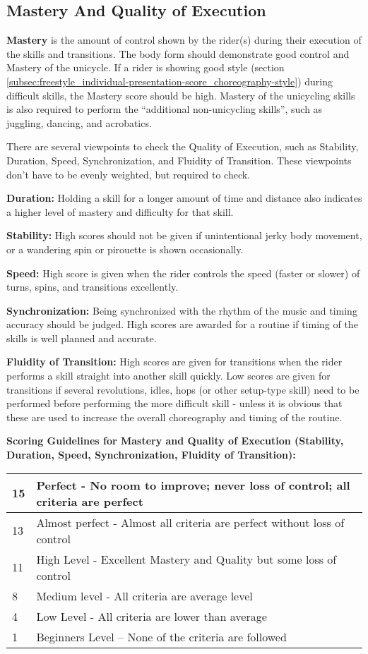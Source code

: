 \subsection{Mastery And Quality of Execution}
\textbf{Mastery} is the amount of control shown by the rider(s) during their execution of the skills and transitions.
The body form should demonstrate good control and Mastery of the unicycle.
If a rider is showing good style (section \ref{subsec:freestyle_individual-presentation-score_choreography-style}) during difficult skills, the Mastery score should be high.
Mastery of the unicycling skills is also required to perform the ``additional non-unicycling skills'', such as juggling, dancing, and acrobatics.

There are several viewpoints to check the Quality of Execution, such as Stability, Duration, Speed, Synchronization, and Fluidity of Transition.
These viewpoints don't have to be evenly weighted, but required to check.

\textbf{Duration:} Holding a skill for a longer amount of time and distance also indicates a higher level of mastery and difficulty for that skill.

\textbf{Stability:} High scores should not be given if unintentional jerky body movement, or a wandering spin or pirouette is shown occasionally.

\textbf{Speed:} High score is given when the rider controls the speed (faster or slower) of turns, spins, and transitions excellently.

\textbf{Synchronization:} Being synchronized with the rhythm of the music and timing accuracy should be judged.
High scores are awarded for a routine if timing of the skills is well planned and accurate.

\textbf{Fluidity of Transition:} High scores are given for transitions when the rider performs a skill straight into another skill quickly.
Low scores are given for transitions if several revolutions, idles, hops (or other setup-type skill) need to be performed before performing the more difficult skill - unless it is obvious that these are used to increase the overall choreography and timing of the routine.

\textbf{Scoring Guidelines for Mastery and Quality of Execution (Stability, Duration, Speed, Synchronization, Fluidity of Transition):} 

\begin{tabular}{|l|p{12.5cm}|}
\hline
15 & Perfect - No room to improve; never loss of control; all criteria are perfect \\
\hline
13 & Almost perfect - Almost all criteria are perfect without loss of control \\
\hline
11 & High Level - Excellent Mastery and Quality but some loss of control \\
\hline
8 &  Medium level - All criteria are average level \\
\hline
4 & Low Level - All criteria are lower than average \\
\hline
1 & Beginners Level – None of the criteria are followed \\
\hline
\end{tabular}

